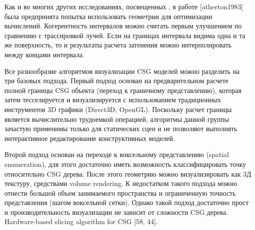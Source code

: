 {{{{Как и во многих других исследованиях, посвещенных , в работе [atherton1983] была предпринята попытка использовать  геометрии для оптимизации вычислений. Когерентность интервалов можно считать первым улучшением по сравнению с трассировкой лучей. Если на границах интервала видима одна и та же поверхность, то и результаты расчета затенения можно интерполировать между концами интервала.


Все разнообразие алгоритмов визуализации CSG моделей можно разделить на три базовых подхода. Первый подход основан на предварительном расчете полной границы CSG объекта (переход к граничному представлению), которая затем тесселируется и визуализируется с использованием традиционных инструментов 3D графики (Direct3D, OpenGL). Поскольку расчет границы является  вычислительно трудоемкой операцией, алгоритмы данной группы зачастую применимы только для статических сцен и не позволяют выполнять интерактивное редактирование конструктивных моделей.

Второй подход основан на переходе к воксельному представлению (spatial enumeration), для этого достаточно иметь возможность классифицировать точку относительно CSG дерева. После этого геометрию можно визуализировать как 3Д текстуру, средствами volume rendering. К недостатком такого подхода можно отнести большой объем занимаемого пространства и ограниченную точность представления (шагом воксельной сетки). Однако такой подход достаточно прост и производительность визуализации не зависит от сложности CSG дерева. Hardware-based slicing algorithm for CSG [58, 44].

}}}}
